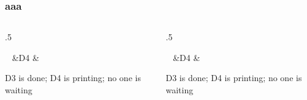 \documentclass[aspectratio=169,10pt,compress]{beamer}
\begin{document}
\begin{frame}[t]\frametitle{aaa}
	\begin{columns}[T] %
	\begin{column}{.5\linewidth} %
		
		\pause
		~
		&{\footnotesize D4}
		&
		{\tiny D3 is done; D4 is printing; no one is waiting}\\
	\end{column} %
	\begin{column}{.5\linewidth} %
		
		\pause
		~
		&{\footnotesize D4}
		&
		{\tiny D3 is done; D4 is printing; no one is waiting}\\
	\end{column} %
	\end{columns} %
\end{frame}

\end{document}
